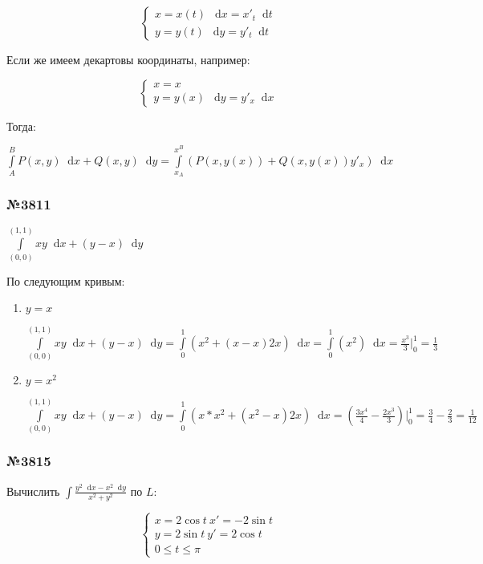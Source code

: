 \documentclass{article}
\newcommand*\diff{\mathop{}\!\mathrm{d}}
\begin{document}
\begin{equation}
    \begin{cases}
        x = x(t) \ \diff x = x'_t \diff t \\
        y = y(t) \ \diff y = y'_t \diff t
    \end{cases}
\end{equation}

Если же имеем декартовы координаты, например:

\begin{equation}
    \begin{cases}
        x = x \\
        y = y(x) \ \diff y = y'_x \diff x
    \end{cases}
\end{equation}

Тогда:

$\int\limits_{A}^{B} P(x, y) \diff x + Q(x, y) \diff y = \int\limits_{x_{A}}^{x^{B}} (P(x, y(x)) + Q(x, y(x)) y'_x) \diff x$

\subsubsection{№3811}

$\int\limits_{(0, 0)}^{(1, 1)} x y \diff x + (y - x) \diff y$

По следующим кривым:

\begin{enumerate}
    \item $y = x$
    
    $\int\limits_{(0, 0)}^{(1, 1)} xy \diff x + (y - x) \diff y = \int\limits_{0}^{1} (x^2 + (x - x) 2x) \diff x = \int\limits_{0}^{1} (x^2) \diff x = \frac{x^3}{3} \bigg|_{0}^{1} = \frac{1}{3}$
    \item $y = x^2$
    
    $\int\limits_{(0, 0)}^{(1, 1)} x y \diff x + (y - x) \diff y = \int\limits_{0}^{1} (x * x^2 + (x^2 - x) 2x) \diff x = (\frac{3x^4}{4} - \frac{2x^3}{3}) \bigg|_{0}^{1} = \frac{3}{4} - \frac{2}{3} = \frac{1}{12}$
\end{enumerate}

\subsubsection{№3815}

Вычислить $\int \frac{y^2 \diff x - x^2 \diff y}{x^2 + y^2}$ по $L$:

\begin{equation}
    \begin{cases}
        x = 2 \cos t \ x' = - 2 \sin t \\
        y = 2 \sin t \ y' = 2 \cos t \\
        0 \le t \le \pi
    \end{cases}
\end{equation}
\end{document}

